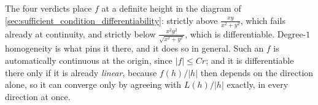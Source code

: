 \begin{exercisesolution}
\begin{remark}
The four verdicts place $f$ at a definite height in the diagram of
\cref{sec:sufficient_condition_differentiability}: strictly above $\tfrac{xy}{x^2+y^2}$, which
fails already at continuity, and strictly below $\tfrac{x^2y^2}{\sqrt{x^2+y^2}}$, which is
differentiable. Degree-$1$ homogeneity is what pins it there, and it does so in general. Such an
$f$ is automatically continuous at the origin, since $\lvert f\rvert \leq Cr$; and it is
differentiable there only if it is already \emph{linear}, because $f(h)/\lvert h\rvert$ then
depends on the direction alone, so it can converge only by agreeing with $L(h)/\lvert h\rvert$
exactly, in every direction at once.
\end{remark}
\end{exercisesolution}
